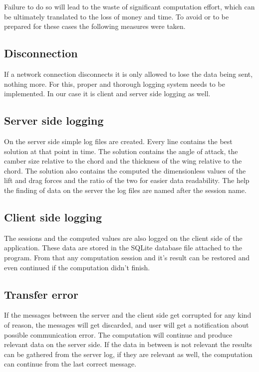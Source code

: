 \documentclass[10pt,a4paper]{report}
\begin{document}
Failure to do so will lead to the waste of significant computation effort, which can be ultimately translated to the loss of money and time. To avoid or to be prepared for these cases the following measures were taken.

\subsection{Disconnection}
If a network connection disconnects it is only allowed to lose the data being sent, nothing more. For this, proper and thorough logging system needs to be implemented. In our case it is client and server side logging as well.

\subsection{Server side logging}
On the server side simple log files are created. Every line contains the best solution at that point in time. The solution contains the angle of attack, the camber size relative to the chord and the thickness of the wing relative to the chord. The solution also contains the computed the dimensionless values of the lift and drag forces and the ratio of the two for easier data readability. The help the finding of data on the server the log files are named after the session name.

\subsection{Client side logging}
The sessions and the computed values are also logged on the client side of the application. These data are stored in the SQLite database file attached to the program. From that any computation session and it's result can be restored and even continued if the computation didn't finish.

\subsection{Transfer error}
If the messages between the server and the client side get corrupted for any kind of reason, the messages will get discarded, and user will get a notification about possible communication error. The computation will continue and produce relevant data on the server side. If the data in between is not relevant the results can be gathered from the server log, if they are relevant as well, the computation can continue from the last correct message.
\end{document}
